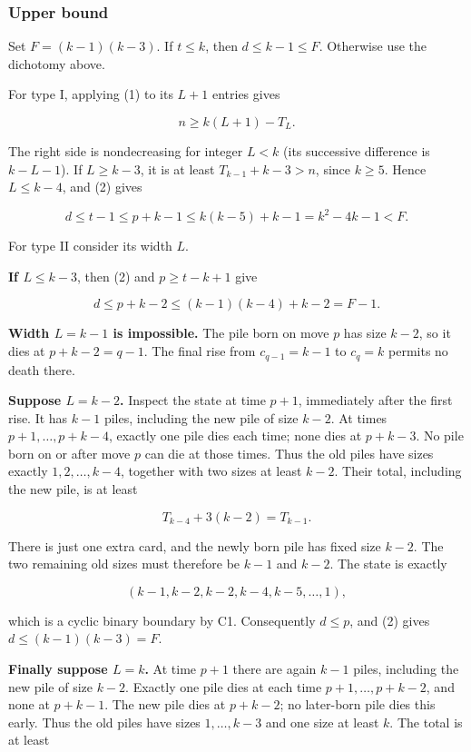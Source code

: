 \documentclass[11pt,a4paper]{article}
\begin{document}
\subsubsection{Upper bound}\label{upper-bound}

Set \(F=(k-1)(k-3)\). If \(t\le k\), then \(d\le k-1\le F\). Otherwise use the dichotomy above.

For type I, applying (1) to its \(L+1\) entries gives

\[
n\ge k(L+1)-T_L.
\]

The right side is nondecreasing for integer \(L<k\) (its successive difference is \(k-L-1\)). If \(L\ge k-3\), it is at least \(T_{k-1}+k-3>n\), since \(k\ge5\). Hence \(L\le k-4\), and (2) gives

\[
d\le t-1\le p+k-1\le k(k-5)+k-1=k^2-4k-1<F.
\]

For type II consider its width \(L\).

\textbf{If \(L\le k-3\)}, then (2) and \(p\ge t-k+1\) give

\[
d\le p+k-2\le(k-1)(k-4)+k-2=F-1.
\]

\textbf{Width \(L=k-1\) is impossible.} The pile born on move \(p\) has size \(k-2\), so it dies at \(p+k-2=q-1\). The final rise from \(c_{q-1}=k-1\) to \(c_q=k\) permits no death there.

\textbf{Suppose \(L=k-2\).} Inspect the state at time \(p+1\), immediately after the first rise. It has \(k-1\) piles, including the new pile of size \(k-2\). At times \(p+1,\ldots,p+k-4\), exactly one pile dies each time; none dies at \(p+k-3\). No pile born on or after move \(p\) can die at those times. Thus the old piles have sizes exactly \(1,2,\ldots,k-4\), together with two sizes at least \(k-2\). Their total, including the new pile, is at least

\[
T_{k-4}+3(k-2)=T_{k-1}.
\]

There is just one extra card, and the newly born pile has fixed size \(k-2\). The two remaining old sizes must therefore be \(k-1\) and \(k-2\). The state is exactly

\[
(k-1,k-2,k-2,k-4,k-5,\ldots,1),
\]

which is a cyclic binary boundary by C1. Consequently \(d\le p\), and (2) gives \(d\le(k-1)(k-3)=F\).

\textbf{Finally suppose \(L=k\).} At time \(p+1\) there are again \(k-1\) piles, including the new pile of size \(k-2\). Exactly one pile dies at each time \(p+1,\ldots,p+k-2\), and none at \(p+k-1\). The new pile dies at \(p+k-2\); no later-born pile dies this early. Thus the old piles have sizes \(1,\ldots,k-3\) and one size at least \(k\). The total is at least
\end{document}
